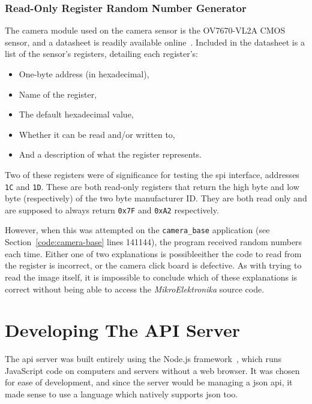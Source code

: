 \subsubsection{Read-Only Register Random Number Generator}
The camera module used on the camera sensor is the OV7670-VL2A CMOS sensor,
and a datasheet is readily available online~\cite{omnivisiondatasheet}.
Included in the datasheet is a list of the sensor's registers, detailing each
register's:

\begin{itemize}
  \item One-byte address (in hexadecimal),
  \item Name of the register,
  \item The default hexadecimal value,
  \item Whether it can be read and/or written to,
  \item And a description of what the register represents.
\end{itemize}

Two of these registers were of significance for testing the \acrshort{spi}
interface, addresses \texttt{1C} and \texttt{1D}. These are both read-only
registers that return the high byte and low byte (respectively) of the two
byte manufacturer ID. They are both read only and are supposed to always
return \texttt{0x7F} and \texttt{0xA2} respectively.

However, when this was attempted on the \texttt{camera\_base} application
(see Section~\ref{code:camera-base} lines 141\textendash{}144), the program
received random numbers each time. Either one of two explanations is possible\textemdash{}either
the code to read from the register is incorrect, or the camera click board is
defective. As with trying to read the image itself, it is impossible to
conclude which of these explanations is correct without being able to access
the \textit{MikroElektronika} source code.

\section{Developing The API Server}
The \acrshort{api} server was built entirely using the Node.js
framework~\cite{nodejs}, which runs JavaScript code on computers and servers
without a web browser. It was chosen for ease of development, and since the
server would be managing a \acrshort{json} \acrshort{api}, it made sense to
use a language which natively supports \acrshort{json} too.

